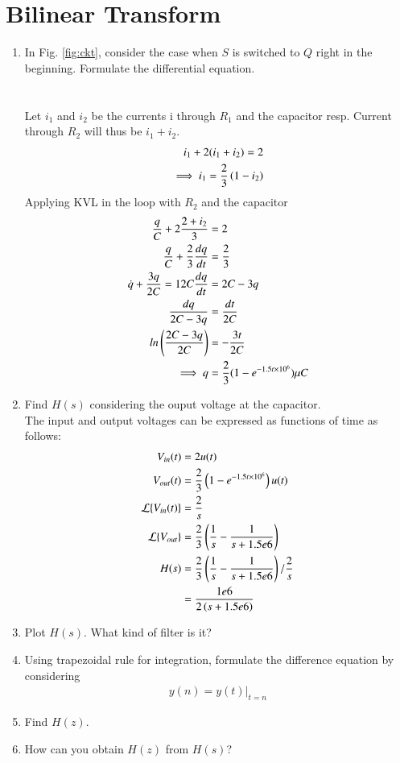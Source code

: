 \documentclass[journal,12pt,twocolumn]{IEEEtran}
\renewcommand\thesection{\arabic{section}}
\begin{document}
	\section{Bilinear Transform}
	\begin{enumerate}[label=\arabic*.,ref=\thesection.\theenumi]
	\item In Fig. 
				\ref{fig:ckt},
				consider the case when $S$ is switched to $Q$ right in the beginning. Formulate the differential equation.\\
				\solution \\\\
	
				Let $i_1$ and $i_2$ be the currents i through $R_1$ and the capacitor resp. Current through $R_2$ will thus be $i_1+i_2$.
				\begin{align}
					i_1+2(i_1+i_2) = 2\\
					\implies i_1 = \frac{2}{3}\left(1-i_2\right)\\
				\end{align}
				Applying KVL in the loop with $R_2$ and the capacitor
				\begin{align}
					\frac{q}{C} + 2\frac{2+i_2}{3} &= 2\\
					\frac{q}{C} +\frac{2}{3}\frac{dq}{dt} &= \frac{2}{3}\\
					\dot{q} + \frac{3q}{2C}=1
				 2C \frac{dq}{dt} &= 2C-3q\\
				    \frac{dq}{2C-3q} &= \frac{dt}{2C}\\
				    ln\left(\frac{2C-3q}{2C}\right) &= -\frac{3t}{2C}\\
				    \implies q &= \frac{2}{3}(1-e^{-1.5t\times10^6})\mu C
				\end{align}
				
	\item  Find $H(s)$ considering the ouput voltage at the capacitor.\\\solution
	The input and output voltages can be expressed as functions of time as follows:
			\begin{align}
				V_{in}(t) &= 2u(t)\\
				V_{out}(t) &= \frac{2}{3}\left(1-e^{-1.5t\times10^6}\right)u(t)\\
				\mathcal{L}\{V_{in}(t)\} &= \frac{2}{s}\\
				\mathcal{L}\{V_{out}\} &= \frac{2}{3}\left(\frac{1}{s} - \frac{1}{s+1.5e6}\right)\\
				H(s) &= \frac{2}{3}\left(\frac{1}{s}-\frac{1}{s+1.5e6}\right)/\frac{2}{s}\\
				&= \frac{1e6}{2\left(s+1.5e6\right)}
			\end{align}
	\item Plot $H(s)$.  What kind of filter is it?
	\item Using trapezoidal rule for integration, formulate the difference equation
		by considering 
	\begin{align}
		y(n) = y(t)\vert_{t=n}
	\end{align}
	\item Find $H(z)$.
	\item How can you obtain $H(z)$ from $H(s)$?
	\end{enumerate}
\end{document}
